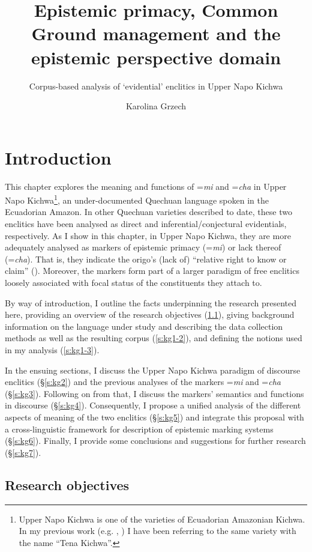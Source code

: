 \documentclass[output=paper]{langscibook}
\author{Karolina Grzech \affiliation{University of Stockholm}}
\title{Epistemic primacy, Common Ground management and the epistemic perspective domain}
\subtitle{Corpus-based analysis of ‘evidential’ enclitics in Upper Napo Kichwa}
\begin{document}
\maketitle

\clearpage
\section{Introduction}\label{s:kg1}

This chapter explores the meaning and functions of =\textit{mi} and =\textit{cha} in Upper Napo Kichwa\footnote{Upper Napo Kichwa is one of the varieties of Ecuadorian Amazonian Kichwa. In my previous work (e.g. \citealt{Grzech2016a}, \citealt{Grzech2016b}) I have been referring to the same variety with the name “Tena Kichwa”.}, an under-documented Quechuan language spoken in the Ecuadorian Amazon. In other Quechuan varieties described to date, these two enclitics have been analysed as direct and inferential/conjectural evidentials, respectively. As I show in this chapter, in Upper Napo Kichwa, they are more adequately analysed as markers of epistemic primacy (=\textit{mi}) or lack thereof (=\textit{cha}). That is, they indicate the origo’s (lack of) “relative right to know or claim” (\citealt[11]{Stivers2011}). Moreover, the markers form part of a larger paradigm of free enclitics loosely associated with focal status of the constituents they attach to.  

By way of introduction, I outline the facts underpinning the research presented here, providing an overview of the research objectives (‎\ref{s:kg1-1}), giving background information on the language under study and describing the data collection methods as well as the resulting corpus (‎\ref{s:kg1-2}), and defining the notions used in my analysis (‎\ref{s:kg1-3}). 

In the ensuing sections, I discuss the Upper Napo Kichwa paradigm of discourse enclitics (§‎\ref{s:kg2}) and the previous analyses of the markers =\textit{mi} and =\textit{cha} (§‎\ref{s:kg3}). Following on from that, I discuss the markers’ semantics and functions in discourse (§‎\ref{s:kg4}). Consequently, I propose a unified analysis of the different aspects of meaning of the two enclitics (§‎\ref{s:kg5}) and integrate this proposal with a cross-linguistic framework for description of epistemic marking systems (§‎\ref{s:kg6}). Finally, I provide some conclusions and suggestions for further research (§‎\ref{s:kg7}).

\subsection{Research objectives}\label{s:kg1-1}
\end{document}
